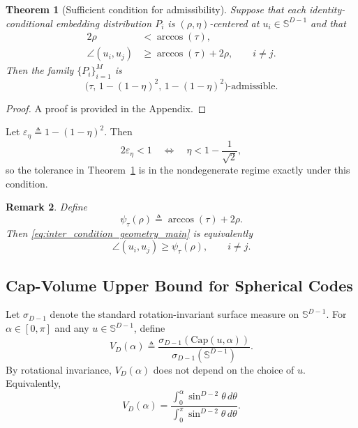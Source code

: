 \documentclass[journal]{IEEEtran}
\newtheorem{theorem}{Theorem}
\newtheorem{remark}[theorem]{Remark}
\begin{document}
\begin{bibunit}
\begin{theorem}[Sufficient condition for admissibility]
\label{thm:sufficient_admissibility_main}
%
Suppose that each identity-conditional embedding distribution $P_i$ is $(\rho,\eta)$-centered at $u_i\in\mathbb S^{D-1}$ and that
%
\begin{align}
2\rho &<\arccos(\tau),
\label{eq:intra_condition_geometry_main}
\\
\angle(u_i,u_j) &\ge \arccos(\tau)+2\rho, \qquad i\ne j.
\label{eq:inter_condition_geometry_main}
\end{align}
%
Then the family $\{P_i\}_{i=1}^M$ is
\[
\bigl( \tau,\, 1-(1-\eta)^2,\, 1-(1-\eta)^2
\bigr)\text{-admissible}.
\]
%
\end{theorem}

\begin{proof}
A proof is provided in the Appendix.
\end{proof}



Let $\varepsilon_\eta\triangleq1-(1-\eta)^2$. Then
\[
2\varepsilon_\eta<1 \quad\Longleftrightarrow\quad \eta<1-\frac{1}{\sqrt{2}},
\]
so the tolerance in Theorem~\ref{thm:sufficient_admissibility_main} is in the nondegenerate regime exactly under this condition.

\begin{remark}
%
Define
\begin{equation}
\psi_\tau(\rho) \triangleq \arccos(\tau)+2\rho.
\label{eq:effective_separation_main}
\end{equation}
%
Then \eqref{eq:inter_condition_geometry_main} is equivalently
\[
\angle(u_i,u_j)\ge\psi_\tau(\rho), \qquad i\ne j.
\]
%
\end{remark}




 
\subsection{Cap-Volume Upper Bound for Spherical Codes}

Let $\sigma_{D-1}$ denote the standard rotation-invariant surface measure on $\mathbb S^{D-1}$. For $\alpha\in[0,\pi]$ and any $u\in\mathbb S^{D-1}$, define
%
\begin{equation}
V_D(\alpha) \triangleq \frac{\sigma_{D-1}(\mathrm{Cap}(u,\alpha))}{\sigma_{D-1}(\mathbb{S}^{D-1})}.
\label{eq:cap_measure_main}
\end{equation}
%
By rotational invariance, $V_D(\alpha)$ does not depend on the choice of $u$. Equivalently,
%
\begin{equation}
V_D(\alpha) = \frac{\int_0^\alpha \sin^{D-2}\theta\,d\theta}{\int_0^\pi \sin^{D-2}\theta\,d\theta}.
\label{eq:cap_measure_integral_main}
\end{equation}
 


\end{bibunit}
\end{document}
